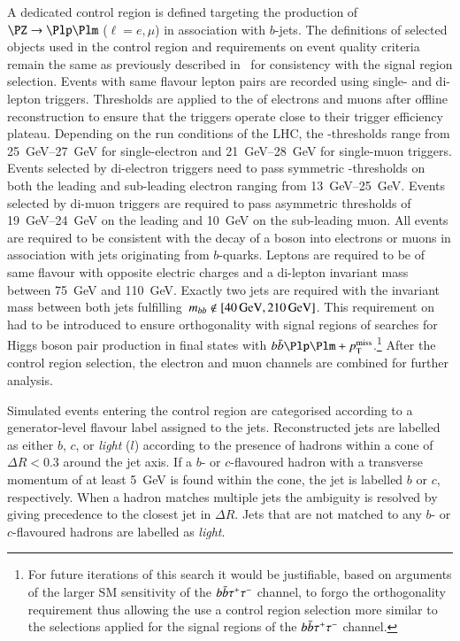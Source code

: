A dedicated control region is defined targeting the production of
$\PZ \ra \Plp\Plm$ ($\ell = e , \mu$) in association with
$b$-jets. The definitions of selected objects used in the control
region and requirements on event quality criteria remain the same as
previously described
in~ for
consistency with the signal region selection. Events with same flavour
lepton pairs are recorded using single- and di-lepton
triggers. Thresholds are applied to the \pT of electrons and muons
after offline reconstruction to ensure that the triggers operate close
to their trigger efficiency plateau. Depending on the run conditions
of the LHC, the \pT-thresholds range from \SIrange{25}{27}{\GeV} for
single-electron and \SIrange{21}{28}{\GeV} for single-muon
triggers. Events selected by di-electron triggers need to pass
symmetric \pT-thresholds on both the leading and sub-leading electron
ranging from \SIrange{13}{25}{\GeV}. Events selected by di-muon
triggers are required to pass asymmetric thresholds of
\SIrange{19}{24}{\GeV} on the leading and \SI{10}{\GeV} on the
sub-leading muon. All events are required to be consistent with the
decay of a \PZ boson into electrons or muons in association with jets
originating from $b$-quarks. Leptons are required to be of same
flavour with opposite electric charges and a di-lepton invariant mass
between \SI{75}{\GeV} and \SI{110}{\GeV}. Exactly two \btagged jets
are required with the invariant mass between both jets
fulfilling~$\mBB \not\in [\SI{40}{\GeV}, \SI{210}{\GeV}]$. This
requirement on \mBB had to be introduced to ensure orthogonality with
signal regions of searches for Higgs boson pair production in final
states with $\bbbar\Plp\Plm + \pTmissAbs$.\footnote{For future
  iterations of this search it would be justifiable, based on
  arguments of the larger SM \HH sensitivity of the
  $b\bar{b}\tau^{+}\tau^{-}$ channel, to forgo the orthogonality
  requirement thus allowing the use a \ZHF control region selection
  more similar to the selections applied for the signal regions of the
  $b\bar{b}\tau^{+}\tau^{-}$ channel.} After the \ZHF control region
selection, the electron and muon channels are combined for further
analysis.

Simulated \Zjets events entering the \ZHF control region are
categorised according to a generator-level flavour label assigned to
the \btagged jets. Reconstructed jets are labelled as either $b$, $c$,
or \emph{light} ($l$) according to the presence of hadrons within a
cone of $\Delta R < 0.3$ around the jet axis. If a $b$- or
$c$-flavoured hadron with a transverse momentum of at least
\SI{5}{\GeV} is found within the cone, the jet is labelled $b$ or $c$,
respectively. When a hadron matches multiple jets the ambiguity is
resolved by giving precedence to the closest jet in $\Delta R$. Jets
that are not matched to any $b$- or $c$-flavoured hadrons are labelled
as \emph{light}.

